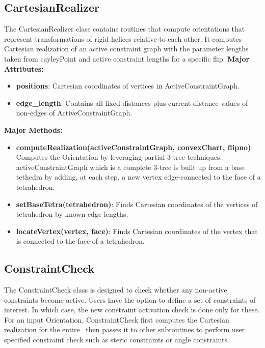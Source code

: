 \subsection{CartesianRealizer} 
The CartesianRealizer class contains routines that
compute orientations that represent transformations of rigid helices
relative to each other. It computes Cartesian realization of an active 
constraint graph with the
parameter lengths taken from cayleyPoint and active constraint lengths for a
specific flip. 
\noindent \textbf{Major Attributes:} 
\begin{itemize}
		\item \textbf{positions}: Cartesian coordinates of vertices in
				ActiveConstraintGraph.
		\item \textbf{edge\_length}: Contains all fixed distances plus current
				distance values of non-edges of ActiveConstraintGraph.
\end{itemize}

\noindent \textbf{Major Methods:}
\begin{itemize}
		\item  \textbf{computeRealization(activeConstraintGraph, convexChart,
				flipno)}: Computes the Orientation by leveraging partial 3-tree
				techniques. activeConstraintGraph which is a complete 3-tree is
				built up from a base tethedra by adding, at each step, a new
				vertex edge-connected to the face of a tetrahedron.
		\item  \textbf{setBaseTetra(tetrahedron)}: Finds Cartesian
				coordinates of the vertices of tetrahedron by known edge
				lengths.
		\item  \textbf{locateVertex(vertex, face)}: Finds Cartesian
				coordinates of the vertex that is connected to the face of a
				tetrahedron.
\end{itemize}


\subsection{ConstraintCheck} 

The ConstraintCheck class is designed to check whether any non-active
constraints become active. Users have the option
to define a set of constraints of interest. In which case, the new constraint
activation check is done only for these. For an input Orientation,
ConstraintCheck first computes the Cartesian realization for the entire \helix\
then passes it to other subroutines to perform user specified constraint check such as
steric constraints or angle constraints.
